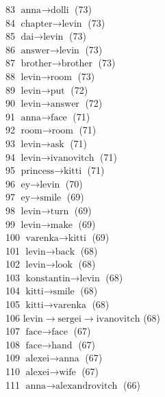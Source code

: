\begin{appendices}
    83  $ \text{anna} \to \text{dolli} $ (73) \\
    84  $ \text{chapter} \to \text{levin} $ (73) \\
    85  $ \text{dai} \to \text{levin} $ (73) \\
    86  $ \text{answer} \to \text{levin} $ (73) \\
    87  $ \text{brother} \to \text{brother} $ (73) \\
    88  $ \text{levin} \to \text{room} $ (73) \\
    89  $ \text{levin} \to \text{put} $ (72) \\
    90  $ \text{levin} \to \text{answer} $ (72) \\
    91  $ \text{anna} \to \text{face} $ (71) \\
    92  $ \text{room} \to \text{room} $ (71) \\
    93  $ \text{levin} \to \text{ask} $ (71) \\
    94  $ \text{levin} \to \text{ivanovitch} $ (71) \\
    95  $ \text{princess} \to \text{kitti} $ (71) \\
    96  $ \text{ey} \to \text{levin} $ (70) \\
    97  $ \text{ey} \to \text{smile} $ (69) \\
    98  $ \text{levin} \to \text{turn} $ (69) \\
    99  $ \text{levin} \to \text{make} $ (69) \\
   100  $ \text{varenka} \to \text{kitti} $ (69) \\
   101  $ \text{levin} \to \text{back} $ (68) \\
   102  $ \text{levin} \to \text{look} $ (68) \\
   103  $ \text{konstantin} \to \text{levin} $ (68) \\
   104  $ \text{kitti} \to \text{smile} $ (68) \\
   105  $ \text{kitti} \to \text{varenka} $ (68) \\
   106  $ \text{levin} \to \text{sergei} \to \text{ivanovitch} $ (68) \\
   107  $ \text{face} \to \text{face} $ (67) \\
   108  $ \text{face} \to \text{hand} $ (67) \\
   109  $ \text{alexei} \to \text{anna} $ (67) \\
   110  $ \text{alexei} \to \text{wife} $ (67) \\
   111  $ \text{anna} \to \text{alexandrovitch} $ (66) \\

\end{appendices}
